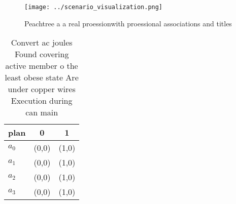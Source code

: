\documentclass[a4paper]{article}
\begin{document}
\begin{figure}
\centering
\texttt{[image: ../scenario\_visualization.png]}
\caption{Peachtree a a real proessionwith proessional associations and titles 
}
\end{figure}
 
\begin{table}
\begin{adjustbox}{width=0.9\columnwidth}
\begin{tabular}{|l|l|l|}
\hline
\textbf{plan} & \multicolumn{1}{c|}{\textbf{0}} & \multicolumn{1}{c|}{\textbf{1}} \\ \hline
\textbf{$a_0$}  & (0,0) & (1,0) \\ \hline
\textbf{$a_1$}  & (0,0) & (1,0) \\ \hline
\textbf{$a_2$}  & (0,0) & (1,0) \\ \hline
\textbf{$a_3$}  & (0,0) & (1,0) \\ \hline
\end{tabular}
\end{adjustbox}
\caption{Convert ac joules Found covering active member o the least obese state Are under copper wires Execution during can main
}
\end{table}
\end{document}
